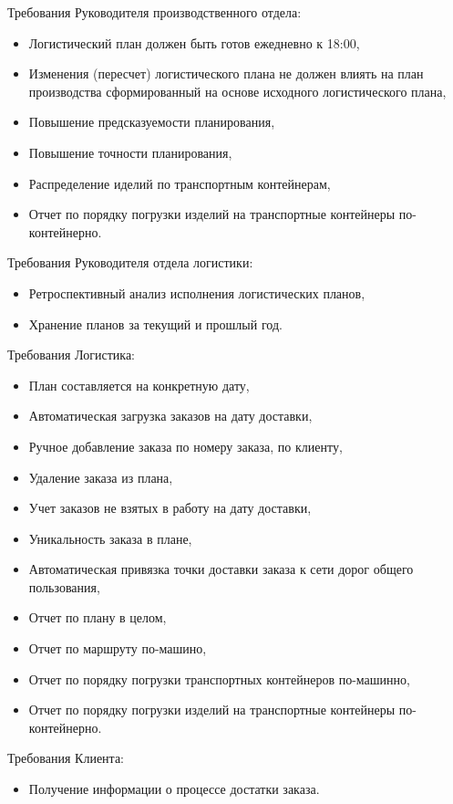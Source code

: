 Требования Руководителя производственного отдела:
\begin{itemize}
    \item Логистический план должен быть готов ежедневно к 18:00,
    \item Изменения (пересчет) логистического плана не должен влиять на план производства сформированный на основе исходного логистического плана,
    \item Повышение предсказуемости планирования,
    \item Повышение точности планирования,
    \item Распределение иделий по транспортным контейнерам,
    \item Отчет по порядку погрузки изделий на транспортные контейнеры по-контейнерно.
\end{itemize}

Требования Руководителя отдела логистики:
\begin{itemize}
    \item Ретроспективный анализ исполнения логистических планов,
    \item Хранение планов за текущий и прошлый год.
\end{itemize}

Требования Логистика:
\begin{itemize}
    \item План составляется на конкретную дату,
    \item Автоматическая загрузка заказов на дату доставки,
    \item Ручное добавление заказа по номеру заказа, по клиенту,
    \item Удаление заказа из плана,
    \item Учет заказов не взятых в работу на дату доставки,
    \item Уникальность заказа в плане,
    \item Автоматическая привязка точки доставки заказа к сети дорог общего пользования,
    \item Отчет по плану в целом,
    \item Отчет по маршруту по-машино,
    \item Отчет по порядку погрузки транспортных контейнеров по-машинно,
    \item Отчет по порядку погрузки изделий на транспортные контейнеры по-контейнерно.
\end{itemize}

Требования Клиента:
\begin{itemize}
    \item Получение информации о процессе достатки заказа.
\end{itemize}

